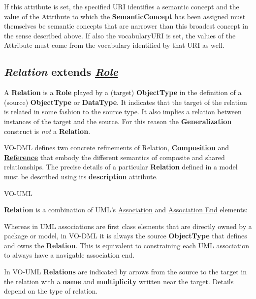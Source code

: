 \documentclass[10pt,a4paper]{ivoa}
\begin{document}
If this attribute is set, the specified URI identifies a semantic
concept and the value of the Attribute to which the
\textbf{SemanticConcept} has been assigned must themselves be semantic
concepts that are narrower than this broadest concept in the sense
described above. If also the vocabularyURI is set, the values of the
Attribute must come from the vocabulary identified by that URI as well.

\hypertarget{relation-extends-role}{%
\subsection{\texorpdfstring{\emph{Relation} extends
\protect\hyperlink{role-extends-referableelement}{\emph{Role}}
}{Relation extends Role }}\label{relation-extends-role}}

A \textbf{Relation} is a \textbf{Role} played by a (target)
\textbf{ObjectType} in the definition of a (source) \textbf{ObjectType}
or \textbf{DataType}. It indicates that the target of the relation is
related in some fashion to the source type. It also implies a relation
between instances of the target and the source. For this reason the
\textbf{Generalization} construct is \emph{not} a \textbf{Relation}.

VO-DML defines two concrete refinements of Relation,
\protect\hyperlink{composition-extends-relation}{\textbf{Composition}}
and \protect\hyperlink{reference-extends-relation}{\textbf{Reference}}
that embody the different semantics of composite and shared
relationships. The precise details of a particular \textbf{Relation}
defined in a model must be described using its \textbf{description}
attribute.

VO-UML

\textbf{Relation} is a combination of UML's
\href{http://www.uml-diagrams.org/association.html}{Association} and
\href{http://www.uml-diagrams.org/association.html\#association-end}{Association
End} elements:

Whereas in UML associations are first class elements that are directly
owned by a package or model, in VO-DML it is always the source
\textbf{ObjectType} that defines and owns the \textbf{Relation}. This is
equivalent to constraining each UML association to always have a
navigable association end.

In VO-UML \textbf{Relations} are indicated by arrows from the source to
the target in the relation with a \textbf{name} and
\textbf{multiplicity} written near the target. Details depend on the
type of relation.
\end{document}
